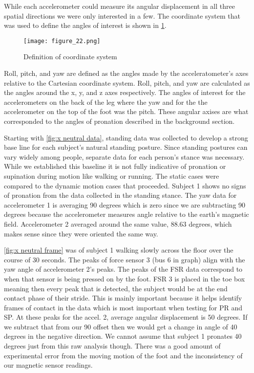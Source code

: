 While each accelerometer could measure its angular displacement in all three spatial directions we were only interested in a few.
The coordinate system that was used to define the angles of interest is shown in \ref{fig:x coords}.\par

\begin{figure}[h]
  \centering
  \texttt{[image: figure\_22.png]}
  \caption[Coordinate system]{Definition of coordinate system}
  \label{fig:x coords}
\end{figure}

Roll, pitch, and yaw are defined as the angles made by the acceleratometer’s axes relative to the Cartesian coordinate system.
Roll, pitch, and yaw are calculated as the angles around the x, y, and z axes respectively.
The angles of interest for the accelerometers on the back of the leg where the yaw and for the the accelerometer on the top of the foot was the pitch.
These angular axises are what corresponded to the angles of pronation described in the background section.\par

Starting with \ref{fig:x neutral data}, standing data was collected to develop a strong base line for each subject's natural standing posture.
Since standing postures can vary widely among people, separate data for each person’s stance was necessary.
While we established this baseline it is not fully indicative of pronation or supination during motion like walking or running.
The static cases were compared to the dynamic motion cases that proceeded.
Subject 1 shows no signs of pronation from the data collected in the standing stance.
The yaw data for accelerometer 1 is averaging 90 degrees which is zero since we are subtracting 90 degrees because the accelerometer measures angle relative to the earth’s magnetic field.
Accelerometer 2 averaged around the same value, 88.63 degrees, which makes sense since they were oriented the same way.\par

\ref{fig:x neutral frame} was of subject 1 walking slowly across the floor over the course of 30 seconds.
The peaks of force sensor 3 (bus 6 in graph) align with the yaw angle of accelerometer 2’s peaks.
The peaks of the FSR data correspond to when that sensor is being pressed on by the foot.
FSR 3 is placed in the toe box meaning then every peak that is detected, the subject would be at the end contact phase of their stride.
This is mainly important because it helps identify frames of contact in the data which is most important when testing for PR and SP.
At these peaks for the accel. 2, average angular displacement is 50 degrees.
If we subtract that from our 90 offset then we would get a change in angle of 40 degrees in the negative direction.
We cannot assume that subject 1 pronates 40 degrees just from this raw analysis though.
There was a good amount of experimental error from the moving motion of the foot and the inconsistency of our magnetic sensor readings.\par

